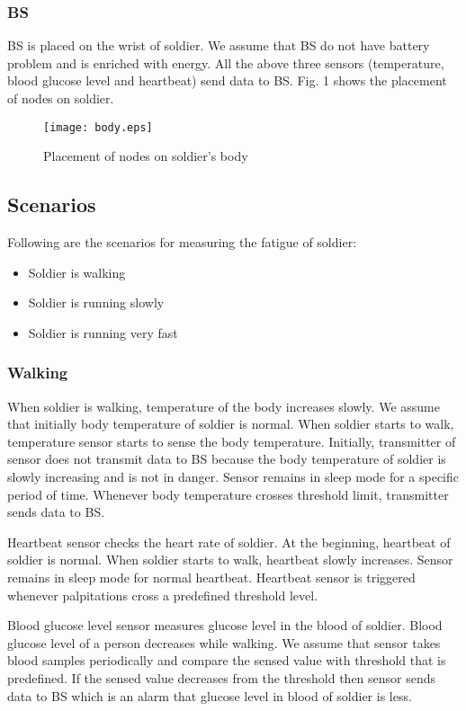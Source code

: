 \documentclass[journal]{IEEEtran}
\begin{document}
\subsubsection{BS}
BS is placed on the wrist of soldier. We assume that BS do not have battery problem and is enriched with energy. All the above three sensors (temperature, blood
 glucose level and heartbeat) send data to BS. Fig. 1 shows the placement of nodes on soldier.
\begin{figure} [!ht]
\centering
\texttt{[image: body.eps]}
\caption{Placement of nodes on soldier's body}
\end{figure}

\subsection{Scenarios}
Following are the scenarios for measuring the fatigue of soldier:

\begin{itemize}
\renewcommand{\labelitemi}{}
\item Soldier is walking
\item Soldier is running slowly
\item Soldier is running very fast
\end{itemize}

\subsubsection{Walking}
When soldier is walking, temperature of the body increases slowly. We assume that initially body temperature of soldier is normal. When soldier starts to walk,
temperature sensor starts to sense the body temperature. Initially, transmitter of sensor does not transmit data to BS because the body temperature of soldier is
slowly increasing and is not in danger. Sensor remains in sleep mode for a specific period of time. Whenever body temperature crosses threshold limit, transmitter
sends data to BS.

Heartbeat sensor checks the heart rate of soldier. At the beginning, heartbeat of soldier is normal. When soldier starts to walk, heartbeat slowly increases.
Sensor remains in sleep mode for normal heartbeat. Heartbeat sensor is triggered whenever palpitations cross a predefined threshold level.

Blood glucose level sensor measures glucose level in the blood of soldier. Blood glucose level of a person decreases while walking. We assume that sensor takes
blood samples periodically and compare the sensed value with threshold that is predefined. If the sensed value decreases from the threshold then sensor sends data
to BS which is an alarm that glucose level in blood of soldier is less.
\end{document}

